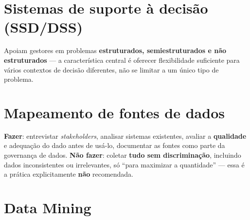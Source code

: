 \section{Sistemas de suporte à decisão (SSD/DSS)}

\begin{conceito}
Apoiam gestores em problemas \textbf{estruturados, semiestruturados e não
estruturados} --- a característica central é oferecer flexibilidade
suficiente para vários contextos de decisão diferentes, não se limitar a
um único tipo de problema.
\end{conceito}

\section{Mapeamento de fontes de dados}

\begin{conceito}
\textbf{Fazer}: entrevistar \textit{stakeholders}, analisar sistemas
existentes, avaliar a \textbf{qualidade} e adequação do dado antes de
usá-lo, documentar as fontes como parte da governança de dados.
\textbf{Não fazer}: coletar \textbf{tudo sem discriminação}, incluindo
dados inconsistentes ou irrelevantes, só “para maximizar a quantidade” ---
essa é a prática explicitamente \textbf{não} recomendada.
\end{conceito}

\section{Data Mining}

